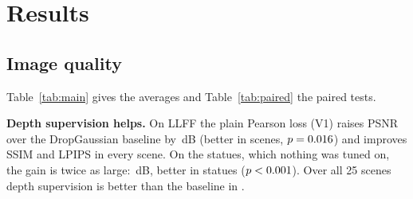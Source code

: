 \section{Results}

\begin{table}[t]
\centering
\caption{Test-view image quality and held-out geometry. LLFF: mean over three seeds of the 8-scene mean, with the seed std for PSNR (for SSIM and LPIPS it is at most 0.003); Statues: seed 0, 17-scene mean. AbsRel is the rendered depth at the test views against the reference reconstruction (lower is better). Bold: best per benchmark.}
\label{tab:main}
\footnotesize
\setlength{\tabcolsep}{3.2pt}

\end{table}

\begin{table}[t]
\centering
\caption{Paired comparisons. $\Delta$ is the first variant minus the second, averaged per scene (over seeds on LLFF) and then over scenes. $p$: two-sided Wilcoxon signed-rank test over scenes. Wins: scenes in which the first variant has the higher PSNR. Both: the 25 scenes of the two benchmarks pooled.}
\label{tab:paired}
\footnotesize
\setlength{\tabcolsep}{3.4pt}

\end{table}

\subsection{Image quality}
Table~\ref{tab:main} gives the averages and Table~\ref{tab:paired} the paired tests.

\textbf{Depth supervision helps.} On LLFF the plain Pearson loss (V1) raises PSNR over the DropGaussian baseline by \LLFFVoneminusVzerodpsnr{}\,dB (better in \LLFFVoneminusVzerowins{} scenes, $p=0.016$) and improves SSIM and LPIPS in every scene. On the statues, which nothing was tuned on, the gain is twice as large: \StatuesVoneminusVzerodpsnr{}\,dB, better in \StatuesVoneminusVzerowins{} statues ($p<0.001$). Over all 25 scenes depth supervision is better than the baseline in \BothVoneminusVzerowins{}.

